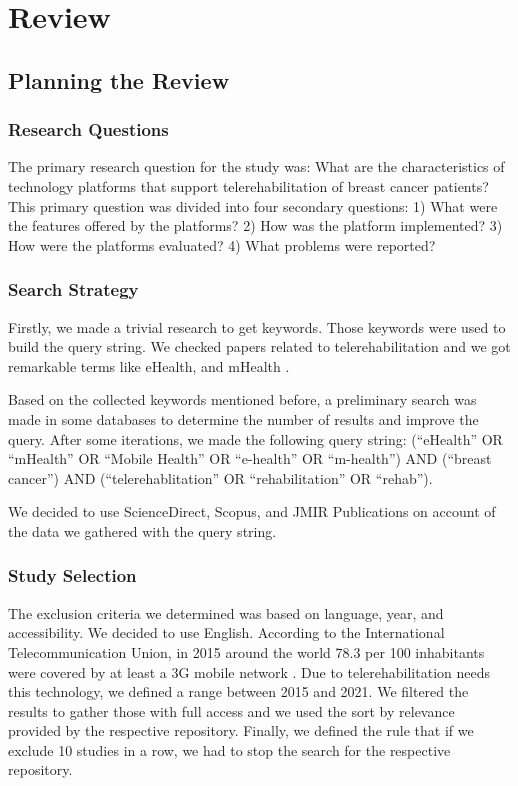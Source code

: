 \documentclass[conference]{IEEEtran}
\begin{document}
\section{Review}

\subsection{Planning the Review}


\subsubsection{Research Questions} \label{subsubsection:research_question}

The primary research question for the study was: What are the characteristics of technology platforms that support telerehabilitation of breast cancer patients? This primary question was divided into four secondary questions: 1) What were the features offered by the platforms? 2) How was the platform implemented? 3) How were the platforms evaluated? 4) What problems were reported?

\subsubsection{Search Strategy}
Firstly, we made a trivial research to get keywords. Those keywords were used to build the query string. We checked papers related to telerehabilitation and we got remarkable terms like eHealth, and mHealth \cite{iacono_scoping_2016}.

Based on the collected keywords mentioned before, a preliminary search was made in some databases to determine the number of results and improve the query. After some iterations, we made the following query string: (``eHealth'' OR ``mHealth'' OR ``Mobile Health'' OR ``e-health'' OR ``m-health'') AND (``breast cancer'') AND (``telerehablitation'' OR ``rehabilitation'' OR ``rehab'').

We decided to use ScienceDirect, Scopus, and JMIR Publications on account of the data we gathered with the query string.

\subsubsection{Study Selection}

The exclusion criteria we determined was based on language, year, and accessibility.  We decided to use English. According to the International Telecommunication Union, in 2015 around the world 78.3 per 100 inhabitants were covered by at least a 3G mobile network \cite{ITU}. Due to telerehabilitation needs this technology, we defined a range between 2015 and 2021. We filtered the results to gather those with full access and we used the sort by relevance provided by the respective repository. Finally, we defined the rule that if we exclude 10 studies in a row, we had to stop the search for the respective repository.
\end{document}
